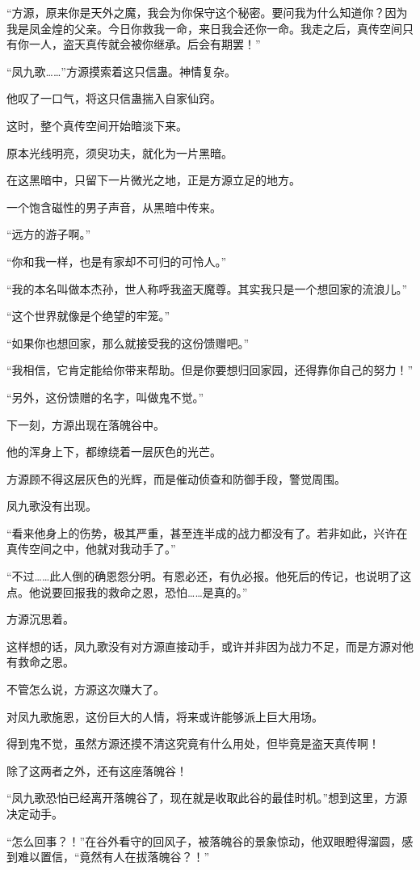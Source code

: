 \begin{this_body}
“方源，原来你是天外之魔，我会为你保守这个秘密。要问我为什么知道你？因为我是凤金煌的父亲。今日你救我一命，来日我会还你一命。我走之后，真传空间只有你一人，盗天真传就会被你继承。后会有期罢！”

“凤九歌……”方源摸索着这只信蛊。神情复杂。

他叹了一口气，将这只信蛊揣入自家仙窍。

这时，整个真传空间开始暗淡下来。

原本光线明亮，须臾功夫，就化为一片黑暗。

在这黑暗中，只留下一片微光之地，正是方源立足的地方。

一个饱含磁性的男子声音，从黑暗中传来。

“远方的游子啊。”

“你和我一样，也是有家却不可归的可怜人。”

“我的本名叫做本杰孙，世人称呼我盗天魔尊。其实我只是一个想回家的流浪儿。”

“这个世界就像是个绝望的牢笼。”

“如果你也想回家，那么就接受我的这份馈赠吧。”

“我相信，它肯定能给你带来帮助。但是你要想归回家园，还得靠你自己的努力！”

“另外，这份馈赠的名字，叫做鬼不觉。”

下一刻，方源出现在落魄谷中。

他的浑身上下，都缭绕着一层灰色的光芒。

方源顾不得这层灰色的光辉，而是催动侦查和防御手段，警觉周围。

凤九歌没有出现。

“看来他身上的伤势，极其严重，甚至连半成的战力都没有了。若非如此，兴许在真传空间之中，他就对我动手了。”

“不过……此人倒的确恩怨分明。有恩必还，有仇必报。他死后的传记，也说明了这点。他说要回报我的救命之恩，恐怕……是真的。”

方源沉思着。

这样想的话，凤九歌没有对方源直接动手，或许并非因为战力不足，而是方源对他有救命之恩。

不管怎么说，方源这次赚大了。

对凤九歌施恩，这份巨大的人情，将来或许能够派上巨大用场。

得到鬼不觉，虽然方源还摸不清这究竟有什么用处，但毕竟是盗天真传啊！

除了这两者之外，还有这座落魄谷！

“凤九歌恐怕已经离开落魄谷了，现在就是收取此谷的最佳时机。”想到这里，方源决定动手。

“怎么回事？！”在谷外看守的回风子，被落魄谷的景象惊动，他双眼瞪得溜圆，感到难以置信，“竟然有人在拔落魄谷？！”

\end{this_body}


